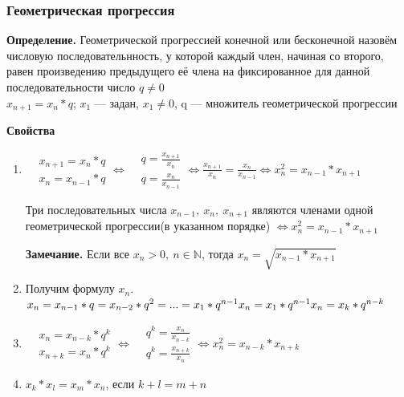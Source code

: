 \documentclass{article}
\begin{document}
    \subsubsection{Геометрическая прогрессия}
    
    \textbf{Определение.} Геометрической прогрессией конечной или бесконечной назовём числовую последовательнность, у которой каждый член, начиная со второго, равен произведению предыдущего её члена на фиксированное для данной последовательности число \(q \not = 0\)
    \\ \(x_{n+1} = x_n * q\); \(x_1\) --- задан, \(x_1 \not = 0\), q --- множитель геометрической прогрессии
    
    \textbf{Свойства}
    
    \begin{enumerate}
    	\item \(\begin{aligned}
				&x_{n+1} = x_n * q\\
				&x_n = x_{n-1} * q
			\end{aligned} \Leftrightarrow
            \begin{aligned}
				&q = \frac{x_{n+1}}{x_n}\\
				&q = \frac{x_{n}}{x_{n-1}}
			\end{aligned} \Leftrightarrow \frac{x_{n+1}}{x_n} = \frac{x_n}{x_{n-1}} \Leftrightarrow x_n^2 = x_{n-1} * x_{n+1}\)
            
            Три последовательных числа \(x_{n-1},\ x_n,\ x_{n+1}\) являются членами одной геометрической прогрессии(в указанном порядке) \(\Leftrightarrow x_n^2 = x_{n-1}*x_{n+1}\)
            
            \textbf{Замечание.} Если все \(x_n > 0,\ n \in \mathbb{N}\), тогда \(x_n = \sqrt{x_{n-1}*x_{n+1}}\)
        \item Получим формулу \(x_n\).
        \\ \(x_n = x_{n-1}*q = x_{n-2} * q^2 = ... = x_1 * q^{n-1}\\ x_n = x_1 * q^{n-1}\\ x_n = x_k * q^{n-k}\)
        \item \(\begin{aligned}
				&x_n = x_{n-k}*q^k\\
				&x_{n+k} = x_n*q^k
			\end{aligned} \Leftrightarrow
            \begin{aligned}
				&q^k = \frac{x_n}{x_{n-k}}\\
				&q^k = \frac{x_{n+k}}{x_n}
			\end{aligned} \Leftrightarrow x_n^2 = x_{n-k}*x_{n+k}\)
        \item \(x_k * x_l = x_m * x_n\), если \(k+l=m+n\)
        

\end{enumerate}
\end{document}
